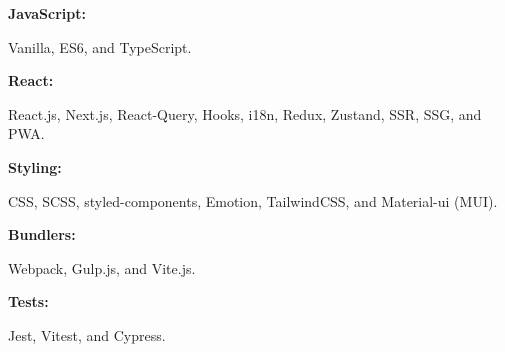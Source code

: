 \documentclass[8pt]{developercv} %
\begin{document}
    \begin{minipage}[t]{0.47\textwidth}
        \vspace{-6pt}

        \begin{minipage}[t]{0.2\textwidth}
            \textbf{JavaScript:}
        \end{minipage}
        \hfill
        \begin{minipage}[t]{0.73\textwidth}
            Vanilla, ES6, and TypeScript.
        \end{minipage}
        \vspace{4pt}

        \begin{minipage}[t]{0.2\textwidth}
            \textbf{React:}
        \end{minipage}
        \hfill
        \begin{minipage}[t]{0.73\textwidth}
            React.js, Next.js, React-Query, Hooks, i18n, Redux, Zustand, SSR, SSG, and PWA.
        \end{minipage}
        \vspace{4pt}

        \begin{minipage}[t]{0.2\textwidth}
            \textbf{Styling:}
        \end{minipage}
        \hfill
        \begin{minipage}[t]{0.73\textwidth}
            CSS, SCSS, styled-components, Emotion, TailwindCSS, and Material-ui (MUI).
        \end{minipage}
        \vspace{4pt}

        \begin{minipage}[t]{0.2\textwidth}
            \textbf{Bundlers:}
        \end{minipage}
        \hfill
        \begin{minipage}[t]{0.73\textwidth}
            Webpack, Gulp.js, and Vite.js.
        \end{minipage}
        \vspace{4pt}

        \begin{minipage}[t]{0.2\textwidth}
            \textbf{Tests:}
        \end{minipage}
        \hfill
        \begin{minipage}[t]{0.73\textwidth}
            Jest, Vitest, and Cypress.
        \end{minipage}
        \vspace{4pt}


\end{minipage}
\end{document}
